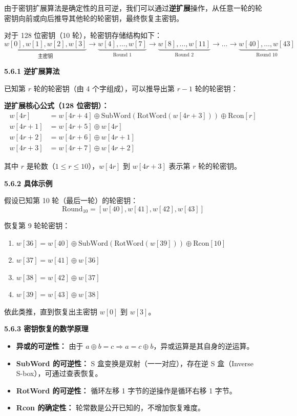 \documentclass[12pt, a4paper]{article}
\begin{document}
\begin{tcolorbox}[notebox=核心思想]
由于密钥扩展算法是确定性的且可逆，我们可以通过\textbf{逆扩展}操作，从任意一轮的轮密钥向前或向后推导其他轮的轮密钥，最终恢复主密钥。
\end{tcolorbox}

对于 128 位密钥（10 轮），轮密钥存储结构如下：
$$
\underbrace{w[0], w[1], w[2], w[3]}_{\text{主密钥}} \to 
\underbrace{w[4], \dots, w[7]}_{\text{Round 1}} \to 
\underbrace{w[8], \dots, w[11]}_{\text{Round 2}} \to \dots \to
\underbrace{w[40], \dots, w[43]}_{\text{Round 10}}
$$

\textbf{5.6.1 逆扩展算法}

已知第 $r$ 轮的轮密钥（由 4 个字组成），可以推导出第 $r-1$ 轮的轮密钥：

\begin{tcolorbox}[mathbox]
\textbf{逆扩展核心公式（128 位密钥）：}
$$
\begin{aligned}
w[4r] &= w[4r+4] \oplus \text{SubWord}(\text{RotWord}(w[4r+3])) \oplus \text{Rcon}[r] \\
w[4r+1] &= w[4r+5] \oplus w[4r] \\
w[4r+2] &= w[4r+6] \oplus w[4r+1] \\
w[4r+3] &= w[4r+7] \oplus w[4r+2]
\end{aligned}
$$
\end{tcolorbox}

其中 $r$ 是轮数（$1 \leqslant r \leqslant 10$），$w[4r]$ 到 $w[4r+3]$ 表示第 $r$ 轮的轮密钥。

\textbf{5.6.2 具体示例}

假设已知第 10 轮（最后一轮）的轮密钥：
$$
\text{Round}_{10} = [w[40], w[41], w[42], w[43]]
$$

恢复第 9 轮轮密钥：
\begin{enumerate}
    \item $w[36] = w[40] \oplus \text{SubWord}(\text{RotWord}(w[39])) \oplus \text{Rcon}[10]$
    \item $w[37] = w[41] \oplus w[36]$
    \item $w[38] = w[42] \oplus w[37]$
    \item $w[39] = w[43] \oplus w[38]$
\end{enumerate}

依此类推，直到恢复出主密钥 $w[0]$ 到 $w[3]$。

\textbf{5.6.3 密钥恢复的数学原理}

\begin{itemize}
    \item \textbf{异或的可逆性：} 由于 $a \oplus b = c \Rightarrow a = c \oplus b$，异或运算是其自身的逆运算。
    \item \textbf{SubWord 的可逆性：} S 盒变换是双射（一一对应），存在逆 S 盒（Inverse S-box），可通过查表恢复。
    \item \textbf{RotWord 的可逆性：} 循环左移 1 字节的逆操作是循环右移 1 字节。
    \item \textbf{Rcon 的确定性：} 轮常数是公开已知的，不增加恢复难度。
\end{itemize}
\end{document}
